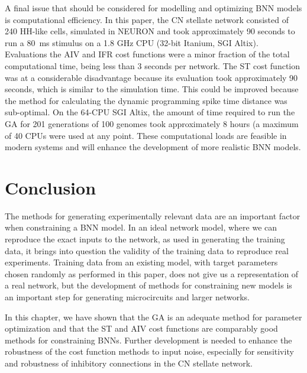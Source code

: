 \medskip{}

A final issue that should be considered for modelling and optimizing BNN models
is computational efficiency. In this paper, the CN stellate network consisted of
240 HH-like cells, simulated in NEURON and took approximately 90 seconds to run
a 80~ms stimulus on a 1.8 GHz CPU (32-bit Itanium, SGI Altix).  Evaluations the
AIV and IFR cost functions were a minor fraction of the total computational
time, being less than 3 seconds per network. The ST cost function was at a
considerable disadvantage because its evaluation took approximately 90 seconds,
which is similar to the simulation time. This could be improved because the
method for calculating the dynamic programming spike time distance was
sub-optimal.  On the 64-CPU SGI Altix, the amount of time required to run the GA
for 201 generations of 100 genomes took approximately 8 hours (a maximum of 40
CPUs were used at any point.  These computational loads are feasible in modern
systems and will enhance the development of more realistic BNN models.


\section{Conclusion}\label{sec:GA:conclusion}

The methods for generating experimentally relevant data are an important factor
when constraining a BNN model. In an ideal network model, where we can reproduce
the exact inputs to the network, as used in generating the training data, it
brings into question the validity of the training data to reproduce real
experiments.  Training data from an existing model, with target parameters
chosen randomly as performed in this paper, does not give us a representation of
a real network, but the development of methods for constraining new models is an
important step for generating microcircuits and larger networks.

\medskip{}

In this chapter, we have shown that the GA is an adequate method for parameter
optimization and that the ST and AIV cost functions are comparably good methods
for constraining BNNs. Further development is needed to enhance the robustness
of the cost function methods to input noise, especially for sensitivity and
robustness of inhibitory connections in the CN stellate network.


